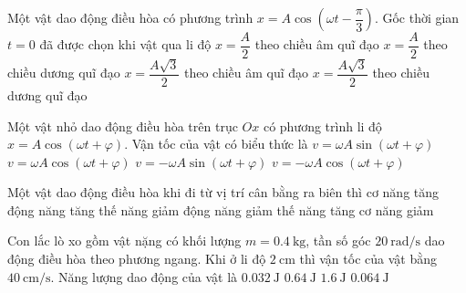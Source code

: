 \begin{ex}
	Một vật dao động điều hòa có phương trình $x=A\cos\left(\omega t-\dfrac{\pi}{3}\right)$. Gốc thời gian $t = 0$ đã được chọn khi vật qua li độ 
	\choice
	{$x=\dfrac{A}{2}$ theo chiều âm quĩ đạo}
	{\True $x=\dfrac{A}{2}$ theo chiều dương quĩ đạo}
	{$x=\dfrac{A\sqrt{3}}{2}$ theo chiều âm quĩ đạo}
	{$x=\dfrac{A\sqrt{3}}{2}$ theo chiều dương quĩ đạo}
	\loigiai{}
\end{ex}
\begin{ex}
	Một vật nhỏ dao động điều hòa trên trục $Ox$ có phương trình li độ $x=A\cos\left(\omega t+\varphi\right)$. Vận tốc của vật có biểu thức là	
	\choice
	{$v=\omega A\sin\left(\omega t+\varphi\right)$}
	{$v=\omega A\cos\left(\omega t+\varphi\right)$}
	{\True $v=-\omega A\sin\left(\omega t+\varphi\right)$}
	{$v=-\omega A\cos\left(\omega t+\varphi\right)$}
	\loigiai{}
\end{ex}
\begin{ex}
	Một vật dao động điều hòa khi đi từ vị trí cân bằng ra biên thì
	\choice
	{cơ năng tăng}
	{động năng tăng thế năng giảm}
	{\True động năng giảm thế năng tăng}
	{cơ năng giảm}
	\loigiai{}
\end{ex}
\begin{ex}
Con lắc lò xo gồm vật nặng có khối lượng $m=\SI{0.4}{\kilogram}$, tần số góc $\SI{20}{\radian/\second}$ dao động điều hòa theo phương ngang. Khi ở li độ $\SI{2}{\centi\meter}$ thì vận tốc của vật bằng $\SI{40}{\centi\meter/\second}$. Năng lượng dao động của vật là	
	\choice
	{$\SI{0.032}{\joule}$}
	{$\SI{0.64}{\joule}$}
	{$\SI{1.6}{\joule}$}
	{\True $\SI{0.064}{\joule}$}
\end{ex}


